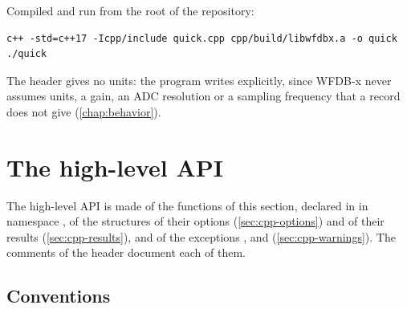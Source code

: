 Compiled and run from the root of the repository:

\begin{lstlisting}[style=shell]
c++ -std=c++17 -Icpp/include quick.cpp cpp/build/libwfdbx.a -o quick
./quick
\end{lstlisting}

The header  gives no units: the program writes  explicitly,
since WFDB-x never assumes units, a gain, an ADC resolution or a sampling frequency that
a record does not give (\cref{chap:behavior}).

\section{The high-level API}
\label{sec:cpp-api}

The high-level API is made of the functions of this section, declared in
 in namespace , of the structures of their options
(\cref{sec:cpp-options}) and of their results (\cref{sec:cpp-results}), and of the
exceptions ,  and 
(\cref{sec:cpp-warnings}). The comments of the header document each of them.

\subsection{Conventions}
\label{sec:cpp-conventions}

